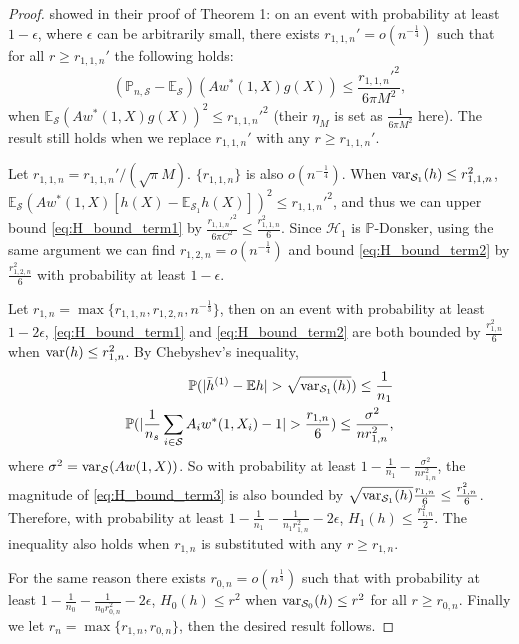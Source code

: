 \documentclass[12pt]{article}
\newcommand{\E}{\mathbb{E}}
\newcommand{\prob}{\mathbb{P}}
\newcommand{\var}{\textnormal{var}}
\begin{document}
\begin{proof}
	\citet{hirshberg2017augmented} showed in their proof of Theorem 1: on an event with probability at least $1 - \epsilon$, where $\epsilon$ can be arbitrarily small, there exists $r_{1,1,n}' = o(n^{-\frac{1}{4}})$ such that for all $r \ge r_{1,1,n}'$ the following holds:
	\begin{equation*}
		(\prob_{n, \mathcal{S}} - \E_\mathcal{S}) (A w^*(1, X) g(X)) \le \frac{r_{1,1,n}'^2 }{6\pi M^2} 
		,\end{equation*}
	when $\E_\mathcal{S} (A w^*(1, X) g(X))^2 \le r_{1,1,n}'^2$ (their $\eta_M$ is set as $\frac{1}{6 \pi M^2}$ here). The result still holds when we replace $r_{1,1,n}'$ with any $r \ge r_{1,1,n}'$.
	
	Let $r_{1,1,n} = r_{1,1,n}'/(\sqrt{\pi}M)$. $\{r_{1,1,n}\}$ is also $o(n^{-\frac{1}{4}})$. When $\var_{\mathcal{S}_1}(h) \le r_{1,1,n}^2$, $\E_\mathcal{S} (Aw^*(1,X)[h(X) - \E_{\mathcal{S}_1}h(X)])^2 \le r_{1,1,n}'^2$, and thus we can upper bound \eqref{eq:H_bound_term1} by $\frac{r_{1,1,n}'^2}{6 \pi C^2}\le \frac{r_{1,1,n}^2}{6}$. Since $\mathcal{H}_1$ is $\prob$-Donsker, using the same argument we can find $r_{1,2,n} = o(n^{-\frac{1}{4}})$ and bound \eqref{eq:H_bound_term2} by $\frac{r_{1,2,n}^2}{6}$ with probability at least $1 - \epsilon$. 
	
	Let $r_{1,n} = \max\{r_{1,1,n}, r_{1,2,n}, n^{-\frac{1}{3}}\}$, then on an event with probability at least $1 - 2\epsilon$, \eqref{eq:H_bound_term1} and \eqref{eq:H_bound_term2} are both bounded by $\frac{r_{1,n}^2}{6}$ when $\var(h) \le r_{1,n}^2$. By  Chebyshev's inequality,
	\begin{align*}
		\prob(|\bar{h}^{(1)} - \E h| > \sqrt{\var_{\mathcal{S}_1}(h)}) \le \frac{1}{n_1} \\
		\prob(|\frac{1}{n_s} \sum_{i \in \mathcal{S}}A_i w^*(1, X_i) - 1| > \frac{r_{1,n}}{6}) \le \frac{\sigma^2}{n r_{1,n}^2}
		,\end{align*}
	where $\sigma^2 = \var_{\mathcal{S}}(A w(1, X))$. So with probability at least $1 - \frac{1}{n_1} - \frac{\sigma^2}{n r_{1,n}^2}$, the magnitude of \eqref{eq:H_bound_term3} is also bounded by $\sqrt{\var_{\mathcal{S}_1}(h)} \frac{r_{1,n}}{6} \le \frac{r_{1,n}^2}{6}$. Therefore, with probability at least $1 - \frac{1}{n_1} - \frac{1}{n_1 r_{1,n}^2} - 2\epsilon$, $H_1(h) \le \frac{r_{1,n}^2}{2}$. The inequality also holds when $r_{1,n}$ is substituted with any $r \ge r_{1,n}$.
	
	For the same reason there exists $r_{0,n} = o(n^{\frac{1}{4}})$ such that with probability at least $1 - \frac{1}{n_0} - \frac{1}{n_0 r_{0,n}^2} - 2\epsilon$, $H_0(h) \le r^2$ when $\var_{\mathcal{S}_0}(h) \le r^2$ for all $r\ge r_{0,n}$. Finally we let $r_n = \max\{r_{1,n}, r_{0,n}\}$, then the desired result follows.
	
\end{proof}
\end{document}
